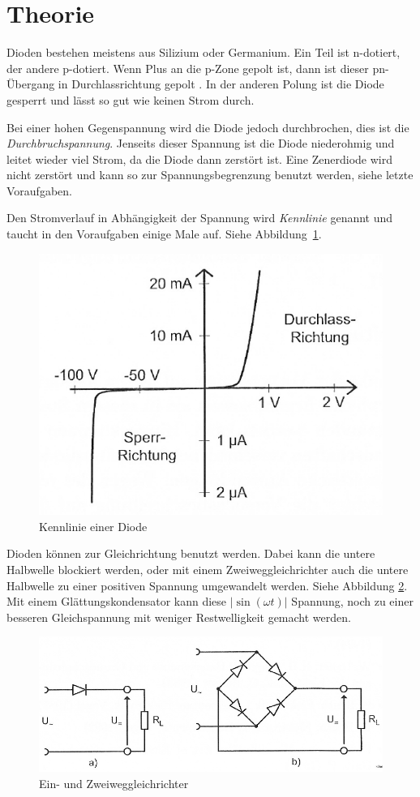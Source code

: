 \section{Theorie}

Dioden bestehen meistens aus Silizium oder Germanium. Ein Teil ist n-dotiert,
der andere p-dotiert. Wenn Plus an die p-Zone gepolt ist, dann ist dieser
pn-Übergang in Durchlassrichtung gepolt
\cite[§~14.1]{beuth/elementare_elektronik}. In der anderen Polung ist die
Diode gesperrt und lässt so gut wie keinen Strom durch.

Bei einer hohen Gegenspannung wird die Diode jedoch durchbrochen, dies ist die
\emph{Durchbruchspannung}. Jenseits dieser Spannung ist die Diode niederohmig
und leitet wieder viel Strom, da die Diode dann zerstört ist. Eine Zenerdiode
wird nicht zerstört und kann so zur Spannungsbegrenzung benutzt werden, siehe
letzte Voraufgaben.

Den Stromverlauf in Abhängigkeit der Spannung wird \emph{Kennlinie} genannt und
taucht in den Voraufgaben einige Male auf. Siehe Abbildung~\ref{fig:2-2}.

\begin{figure}[h]
	\centering
	\caption{%
		Kennlinie einer Diode \cite[Abbildung~2.2]{physik313-Anleitung}
	}
	\label{fig:2-2}
	\includegraphics[width=.45\linewidth]{Bilder_aus_Anleitung/2-2.png}
\end{figure}

Dioden können zur Gleichrichtung benutzt werden. Dabei kann die untere
Halbwelle blockiert werden, oder mit einem Zweiweggleichrichter auch die untere
Halbwelle zu einer positiven Spannung umgewandelt werden. Siehe Abbildung
\ref{fig:2-4}. Mit einem Glättungskondensator kann diese $|\sin(\omega t)|$
Spannung, noch zu einer besseren Gleichspannung mit weniger Restwelligkeit
gemacht werden.

\begin{figure}[h]
	\centering
	\caption{%
		Ein- und Zweiweggleichrichter \cite[Abbildung~2.4]{physik313-Anleitung}
	}
	\label{fig:2-4}
	\includegraphics[width=.7\linewidth]{Bilder_aus_Anleitung/2-4.png}
\end{figure}

